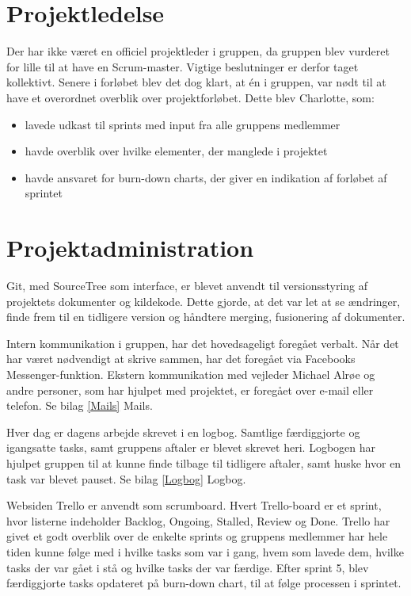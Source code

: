 \section{Projektledelse}
Der har ikke været en officiel projektleder i gruppen, da gruppen blev vurderet for lille til at have en Scrum-master. Vigtige beslutninger er derfor taget kollektivt. Senere i forløbet blev det dog klart, at én i gruppen, var nødt til at have et overordnet overblik over projektforløbet. Dette blev Charlotte, som: 
\begin{itemize}
\item lavede udkast til sprints  med input fra alle gruppens medlemmer
\item havde overblik over hvilke elementer, der manglede i projektet
\item havde ansvaret for burn-down charts, der giver en indikation af forløbet af sprintet
\end{itemize} 

\section{Projektadministration}
Git, med SourceTree som interface, er blevet anvendt til versionsstyring af projektets dokumenter og kildekode. Dette gjorde, at det var let at se ændringer, finde frem til en tidligere version og håndtere merging, fusionering af dokumenter.

Intern kommunikation i gruppen, har det hovedsageligt foregået verbalt. Når det har været nødvendigt at skrive sammen, har det foregået via Facebooks Messenger-funktion. Ekstern kommunikation med vejleder Michael Alrøe og andre personer, som har hjulpet med projektet, er foregået over e-mail eller telefon. Se bilag \ref{Mails} Mails.  

Hver dag er dagens arbejde skrevet i en logbog. Samtlige færdiggjorte og igangsatte tasks, samt gruppens aftaler er blevet skrevet heri. Logbogen har hjulpet gruppen til at kunne finde tilbage til tidligere aftaler, samt huske hvor en task var blevet pauset. Se bilag \ref{Logbog} Logbog.  

Websiden Trello er anvendt som scrumboard. Hvert Trello-board er et sprint, hvor listerne indeholder Backlog, Ongoing, Stalled, Review og Done. Trello har givet et godt overblik over de enkelte sprints og gruppens medlemmer har hele tiden kunne følge med i hvilke tasks som var i gang, hvem som lavede dem, hvilke tasks der var gået i stå og hvilke tasks der var færdige. Efter sprint 5, blev færdiggjorte tasks opdateret på burn-down chart, til at følge processen i sprintet. 

